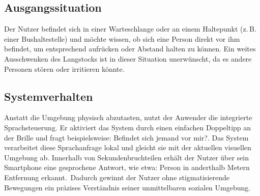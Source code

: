 \subsection{Ausgangssituation}
Der Nutzer befindet sich in einer Warteschlange oder an einem Haltepunkt (z.\,B. einer Bushaltestelle) und möchte wissen, ob sich eine Person direkt vor ihm befindet, um entsprechend aufrücken oder Abstand halten zu können. Ein weites Ausschwenken des Langstocks ist in dieser Situation unerwünscht, da es andere Personen stören oder irritieren könnte.

\subsection{Systemverhalten}
Anstatt die Umgebung physisch abzutasten, nutzt der Anwender die integrierte Sprachsteuerung. Er aktiviert das System durch einen einfachen Doppeltipp an der Brille und fragt beispielsweise: \glqq Befindet sich jemand vor mir?\grqq. Das System verarbeitet diese Sprachanfrage lokal und gleicht sie mit der aktuellen visuellen Umgebung ab. Innerhalb von Sekundenbruchteilen erhält der Nutzer über sein Smartphone eine gesprochene Antwort, wie etwa: \glqq Person in anderthalb Metern Entfernung erkannt.\grqq\ Dadurch gewinnt der Nutzer ohne stigmatisierende Bewegungen ein präzises Verständnis seiner unmittelbaren sozialen Umgebung.